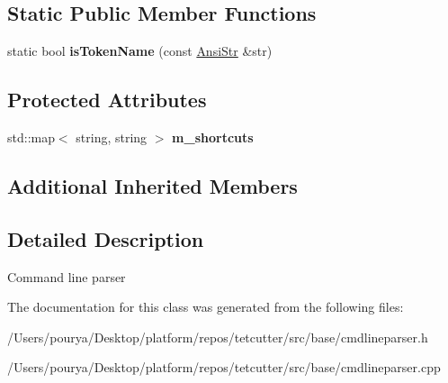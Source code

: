 \subsection*{Static Public Member Functions}
\begin{DoxyCompactItemize}
\item 
\hypertarget{classps_1_1CmdLineParser_aa5d870936f5c3e75d97f8c3513a9cb25}{}static bool {\bfseries is\+Token\+Name} (const \hyperlink{classps_1_1base_1_1CAString}{Ansi\+Str} \&str)\label{classps_1_1CmdLineParser_aa5d870936f5c3e75d97f8c3513a9cb25}

\end{DoxyCompactItemize}
\subsection*{Protected Attributes}
\begin{DoxyCompactItemize}
\item 
\hypertarget{classps_1_1CmdLineParser_ac1812b24af8144f8a4e3a51c9ab12064}{}std\+::map$<$ string, string $>$ {\bfseries m\+\_\+shortcuts}\label{classps_1_1CmdLineParser_ac1812b24af8144f8a4e3a51c9ab12064}

\end{DoxyCompactItemize}
\subsection*{Additional Inherited Members}


\subsection{Detailed Description}
Command line parser 

The documentation for this class was generated from the following files\+:\begin{DoxyCompactItemize}
\item 
/\+Users/pourya/\+Desktop/platform/repos/tetcutter/src/base/cmdlineparser.\+h\item 
/\+Users/pourya/\+Desktop/platform/repos/tetcutter/src/base/cmdlineparser.\+cpp\end{DoxyCompactItemize}
